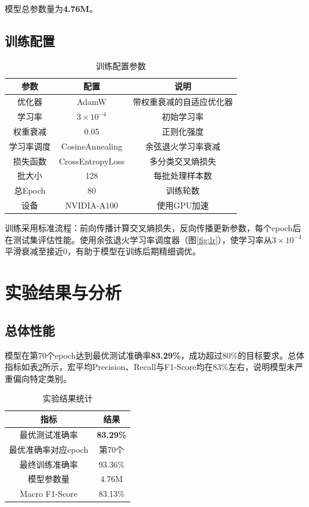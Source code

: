 \documentclass[12pt,a4paper]{article}
\begin{document}
模型总参数量为\textbf{4.76M}。

\subsection{训练配置}

\begin{table}[H]
\centering
\begin{tabular}{ccc}
\toprule
参数 & 配置 & 说明 \\
\midrule
优化器 & AdamW & 带权重衰减的自适应优化器 \\
学习率 & $3 \times 10^{-4}$ & 初始学习率 \\
权重衰减 & 0.05 & 正则化强度 \\
学习率调度 & CosineAnnealing & 余弦退火学习率衰减 \\
损失函数 & CrossEntropyLoss & 多分类交叉熵损失 \\
批大小 & 128 & 每批处理样本数 \\
总Epoch & 80 & 训练轮数 \\
设备 & NVIDIA-A100 & 使用GPU加速 \\
\bottomrule
\end{tabular}
\caption{训练配置参数}
\label{tab:training_config}
\end{table}

训练采用标准流程：前向传播计算交叉熵损失，反向传播更新参数，每个epoch后在测试集评估性能。使用余弦退火学习率调度器（图\ref{fig:lr}），使学习率从$3 \times 10^{-4}$平滑衰减至接近0，有助于模型在训练后期精细调优。

\section{实验结果与分析}

\subsection{总体性能}

模型在第70个epoch达到最优测试准确率\textbf{83.29\%}，成功超过80\%的目标要求。总体指标如表\ref{tab:results}所示，宏平均Precision、Recall与F1-Score均在83\%左右，说明模型未严重偏向特定类别。

\begin{table}[H]
\centering
\begin{tabular}{cc}
\toprule
指标 & 结果 \\
\midrule
最优测试准确率 & \textbf{83.29\%} \\
最优准确率对应epoch & 第70个 \\
最终训练准确率 & 93.36\% \\
模型参数量 & 4.76M \\
Macro F1-Score & 83.13\% \\
\bottomrule
\end{tabular}
\caption{实验结果统计}
\label{tab:results}
\end{table}
\end{document}
